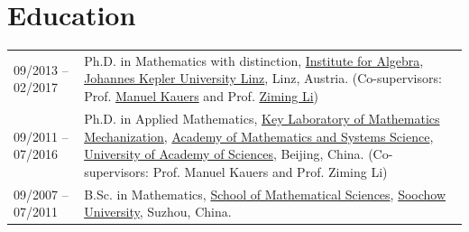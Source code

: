 \documentclass[a4paper,12pt]{article}
\begin{document}
\section*{\Large{Education}}
\begin{tabular}{@{}p{1.4in}p{4.5in}}
09/2013 -- 02/2017    & Ph.D. in Mathematics with distinction, 
                        \href{http://www.jku.at/algebra/content}{Institute for Algebra}, 
                        \href{http://www.jku.at/content}{Johannes Kepler University Linz}, Linz, Austria. 
                        (Co-supervisors: Prof. \href{http://www.kauers.de/}{Manuel Kauers} and 
                        Prof. \href{http://mmrc.iss.ac.cn/~zmli/}{Ziming Li})\\
09/2011 -- 07/2016    & Ph.D. in Applied Mathematics, 
                        \href{http://english.mmrc.amss.cas.cn/}{Key Laboratory of Mathematics Mechanization}, 
                        \href{http://english.amss.cas.cn/}{Academy of Mathematics and Systems Science}, 
                        \href{http://english.ucas.ac.cn/}{University of Academy of Sciences}, Beijing, China. 
                        (Co-supervisors: Prof. Manuel Kauers and Prof. Ziming Li)\\
09/2007 -- 07/2011    & B.Sc. in Mathematics, \href{http://math.suda.edu.cn/}{School of Mathematical Sciences}, 
                        \href{http://eng.suda.edu.cn/}{Soochow University}, Suzhou, China.  
\end{tabular} \\
\end{document}
